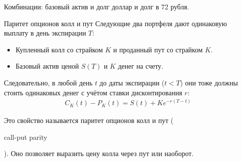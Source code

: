 \documentclass{beamer}
\newcommand{\en}[1]{\begin{otherlanguage}{english}#1\end{otherlanguage}}
\begin{document}
\begin{frame}{Комбинации: базовый актив и долг}
 доллар и долг в 72 рубля.

\justifying
\centering
\end{frame}



\begin{frame}{Паритет опционов колл и пут}
\justify
Следующие два портфеля дают одинаковую выплату в день экспирации $T$:
\begin{itemize}
\justifying
\item Купленный колл со страйком $K$ и проданный пут со страйком $K$.
\item Базовый актив ценой $S(T)$ и $K$ денег на счету.
\end{itemize}

\justify
Следовательно, в любой день $t$ до даты экспирации ($t<T$) они тоже должны стоить одинаковых денег с учётом ставки дисконтирования $r$:
\begin{align*}
C_K(t) - P_K(t) = S(t) + Ke^{-r(T-t)}
\end{align*}

\justify
Это свойство называется \alert{паритет опционов колл и пут} (\en{call-put parity}). Оно позволяет выразить цену колла через пут или наоборот.
\end{frame}
\end{document}
